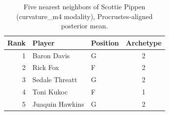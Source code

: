 \begin{table}[htbp]
  \centering\small
  \begin{tabular}{rllc}
    \toprule
    Rank & Player & Position & Archetype \\
    \midrule
    1 & Baron Davis & G & 2 \\
    2 & Rick Fox & F & 2 \\
    3 & Sedale Threatt & G & 2 \\
    4 & Toni Kukoc & F & 1 \\
    5 & Juaquin Hawkins & G & 2 \\
    \bottomrule
  \end{tabular}
  \caption{Five nearest neighbors of Scottie Pippen (curvature_m4 modality), Procrustes-aligned posterior mean.}
  \label{tab:Scottie_Pippen_neighbors_curvature_m4}
\end{table}

